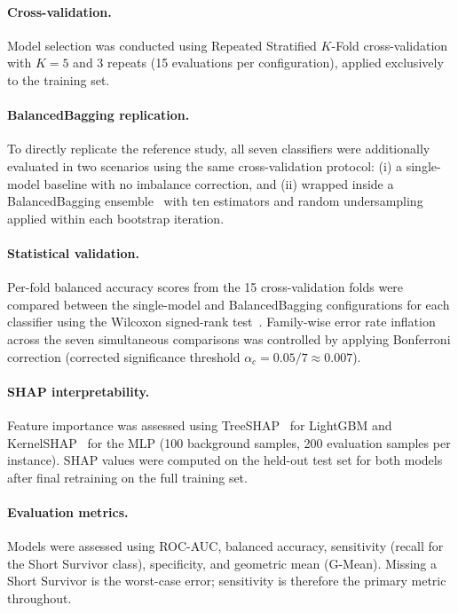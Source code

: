 \documentclass[preprint,12pt]{elsarticle}
\begin{document}
\paragraph{Cross-validation.}
Model selection was conducted using Repeated Stratified $K$-Fold cross-validation
with $K = 5$ and 3 repeats (15 evaluations per configuration), applied
exclusively to the training set.

\paragraph{BalancedBagging replication.}
To directly replicate the reference study, all seven classifiers were additionally
evaluated in two scenarios using the same cross-validation protocol: (i) a
single-model baseline with no imbalance correction, and (ii) wrapped inside a
BalancedBagging ensemble~\cite{lemaitre2017} with ten estimators and random
undersampling applied within each bootstrap iteration.

\paragraph{Statistical validation.}
Per-fold balanced accuracy scores from the 15 cross-validation folds were compared
between the single-model and BalancedBagging configurations for each classifier
using the Wilcoxon signed-rank test~\cite{wilcoxon1945}. Family-wise error rate
inflation across the seven simultaneous comparisons was controlled by applying
Bonferroni correction (corrected significance threshold
$\alpha_c = 0.05 / 7 \approx 0.007$).

\paragraph{SHAP interpretability.}
Feature importance was assessed using TreeSHAP~\cite{lundberg2020treeshap} for
LightGBM and KernelSHAP~\cite{lundberg2017shap} for the MLP (100 background
samples, 200 evaluation samples per instance). SHAP values were computed on the
held-out test set for both models after final retraining on the full training set.

\paragraph{Evaluation metrics.}
Models were assessed using ROC-AUC, balanced accuracy, sensitivity (recall for the
Short Survivor class), specificity, and geometric mean (G-Mean). Missing a Short
Survivor is the worst-case error; sensitivity is therefore the primary metric
throughout.
\end{document}
